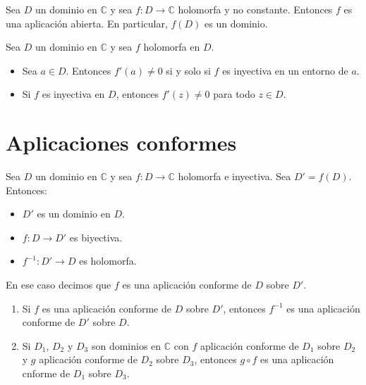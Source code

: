 \begin{theorem}
    Sea $D$ un dominio en $\mathbb{C}$ y sea $f: D \to \mathbb{C}$ holomorfa y no constante.
    Entonces $f$ es una aplicación abierta.
    En particular, $f(D)$ es un dominio.
\end{theorem}

\begin{lemma}
    Sea $D$ un dominio en $\mathbb{C}$ y sea $f$ holomorfa en $D$.
    \begin{itemize}
        \item Sea $a \in D$.
              Entonces $f'(a) \neq 0$ si y solo si $f$ es inyectiva en un entorno de $a$.
        \item Si $f$ es inyectiva en $D$, entonces $f'(z) \neq 0$ para todo $z \in D$.
    \end{itemize}
\end{lemma}

\section*{Aplicaciones conformes}
\begin{definition}
    Sea $D$ un dominio en $\mathbb{C}$ y sea $f: D \to \mathbb{C}$ holomorfa e inyectiva.
    Sea $D' = f(D)$.
    Entonces:
    \begin{itemize}
        \item $D'$ es un dominio en $D$.
        \item $f: D \to D'$ es biyectiva.
        \item $f^{-1}: D' \to D$ es holomorfa.
    \end{itemize}

    En ese caso decimos que $f$ es una aplicación conforme de $D$ sobre $D'$.
\end{definition}

\begin{remark}
    \hfill
    \begin{enumerate}
        \item Si $f$ es una aplicación conforme de $D$ sobre $D'$, entonces $f^{-1}$ es una aplicación conforme de $D'$ sobre $D$.
        \item Si $D_1$, $D_2$ y $D_3$ son dominios en $\mathbb{C}$ con $f$ aplicación conforme de $D_1$ sobre $D_2$ y $g$ aplicación conforme de $D_2$ sobre $D_3$, entonces $g \circ f$ es una aplicación cnforme de $D_1$ sobre $D_3$.
    \end{enumerate}
\end{remark}

